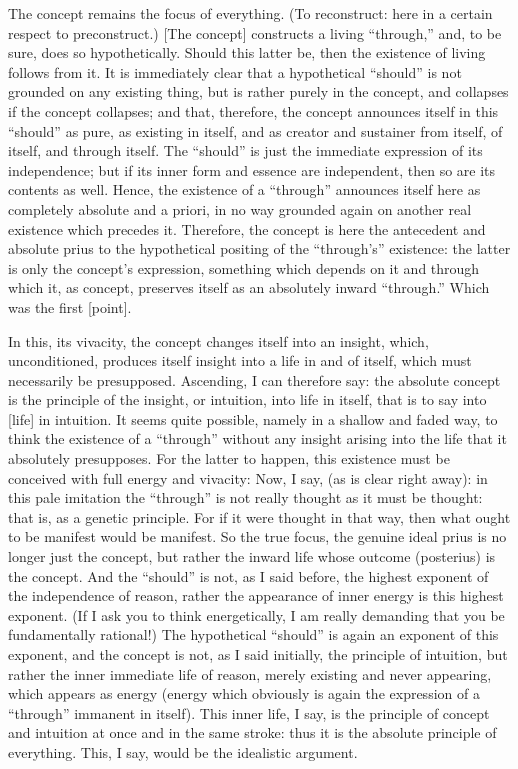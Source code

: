 The concept remains the focus of everything.
(To reconstruct: here in a certain respect to preconstruct.)
[The concept] constructs a living “through,”
and, to be sure, does so hypothetically.
Should this latter be,
then the existence of living follows from it.
It is immediately clear that a hypothetical “should” is
not grounded on any existing thing,
but is rather purely in the concept,
and collapses if the concept collapses;
and that, therefore, the concept announces
itself in this “should” as pure,
as existing in itself,
and as creator and sustainer
from itself, of itself, and through itself.
The “should” is just the immediate
expression of its independence;
but if its inner form and essence are independent,
then so are its contents as well.
Hence, the existence of a “through”
announces itself here as completely absolute and a priori,
in no way grounded again on another real existence which precedes it.
Therefore, the concept is here the antecedent
and absolute prius to the hypothetical positing
of the “through's” existence:
the latter is only the concept's expression,
something which depends on it
and through which it, as concept, preserves itself
as an absolutely inward “through.”
Which was the first [point].

In this, its vivacity,
the concept changes itself into an insight,
which, unconditioned, produces itself
insight into a life in and of itself,
which must necessarily be presupposed.
Ascending, I can therefore say:
the absolute concept is the principle of the insight,
or intuition, into life in itself,
that is to say into [life] in intuition.
It seems quite possible, namely in a shallow and faded way,
to think the existence of a “through” without any insight
arising into the life that it absolutely presupposes.
For the latter to happen, this existence must
be conceived with full energy and vivacity:
Now, I say, (as is clear right away):
in this pale imitation the “through” is
not really thought as it must be thought:
that is, as a genetic principle.
For if it were thought in that way,
then what ought to be manifest would be manifest.
So the true focus, the genuine ideal prius is
no longer just the concept,
but rather the inward life
whose outcome (posterius) is the concept.
And the “should” is not, as I said before, the highest
exponent of the independence of reason,
rather the appearance of inner energy is this highest exponent.
(If I ask you to think energetically,
I am really demanding that you be fundamentally rational!)
The hypothetical “should” is again an exponent of this exponent,
and the concept is not, as I said initially,
the principle of intuition,
but rather the inner immediate life of reason,
merely existing and never appearing,
which appears as energy
(energy which obviously is again
the expression of a “through” immanent in itself).
This inner life, I say, is the principle
of concept and intuition at once
and in the same stroke:
thus it is the absolute principle of everything.
This, I say, would be the idealistic argument.

